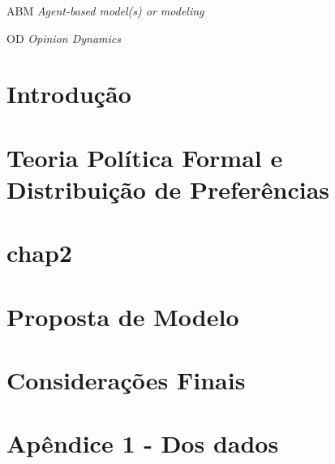 \documentclass[
12pt,				%
openright,			%
oneside,			%
a4paper,			%
english, %
french, %
spanish, %
brazil %
]{abntex2}
\begin{document}
\begin{siglas}
\item[ABM] \textit{Agent-based model(s) or modeling}
  \item[OD] \textit{ Opinion Dynamics}
 
\end{siglas}
	\tableofcontents*
	\cleardoublepage
	\textual
	
	
	
\chapter*[Introdução]{Introdução}
      
\chapter{Teoria Política Formal e Distribuição de Preferências}


\chapter{chap2}


 


 \chapter{Proposta de Modelo}

 



\chapter*[Considerações Finais]{Considerações Finais}
  
    

\chapter*[Apêndice 1]{Apêndice 1 - Dos dados}

	
\postextual
	

	
 \printindex
	
\end{document}
